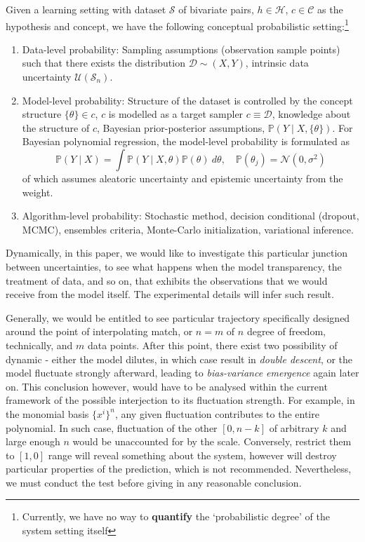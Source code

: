 \documentclass[
  journal=largetwo,
  year=2025,
  volume=37,
]{cup-journal}
\begin{document}
\begin{definition}
    Given a learning setting with dataset $\mathcal{S}$ of bivariate pairs, $h\in \mathcal{H}$, $c\in \mathcal{C}$ as the hypothesis and concept, we have the following conceptual probabilistic setting:\footnote{Currently, we have no way to \textbf{quantify} the `probabilistic degree' of the system setting itself}
    \begin{enumerate}
        \item Data-level probability: Sampling assumptions (observation sample points) such that there exists the distribution $\mathcal{D}\sim (X,Y)$, intrinsic data uncertainty $\mathcal{U}(\mathcal{S}_{n})$. 
        \item Model-level probability: Structure of the dataset is controlled by the concept structure $\{\theta\}\in c$, $c$ is modelled as a target sampler $c\equiv \mathcal{D}$, knowledge about the structure of $c$, Bayesian prior-posterior assumptions, $\mathbb{P}(Y\mid X, \{\theta\})$. For Bayesian polynomial regression, the model-level probability is formulated as \begin{equation}
            \mathbb{P}(Y\mid X) = \int \mathbb{P}(Y\mid X,\theta)\mathbb{P}(\theta)\: d\theta, \quad \mathbb{P}(\theta_{j}) = \mathcal{N}(0,\sigma^{2})
        \end{equation}
        of which assumes aleatoric uncertainty and epistemic uncertainty from the weight. 
        \item Algorithm-level probability: Stochastic method, decision conditional (dropout, MCMC), ensembles criteria, Monte-Carlo initialization, variational inference. 
    \end{enumerate}
\end{definition}

Dynamically, in this paper, we would like to investigate this particular junction between uncertainties, to see what happens when the model transparency, the treatment of data, and so on, that exhibits the observations that we would receive from the model itself. The experimental details will infer such result. 

Generally, we would be entitled to see particular trajectory specifically designed around the point of interpolating match, or $n=m$ of $n$ degree of freedom, technically, and $m$ data points. After this point, there exist two possibility of dynamic - either the model dilutes, in which case result in \textit{double descent}, or the model fluctuate strongly afterward, leading to \textit{bias-variance emergence} again later on. This conclusion however, would have to be analysed within the current framework of the possible interjection to its fluctuation strength. For example, in the monomial basis $\{x^{i}\}^{n}$, any given fluctuation contributes to the entire polynomial. In such case, fluctuation of the other $[0,n-k]$ of arbitrary $k$ and large enough $n$ would be unaccounted for by the scale. Conversely, restrict them to $[1,0]$ range will reveal something about the system, however will destroy particular properties of the prediction, which is not recommended. Nevertheless, we must conduct the test before giving in any reasonable conclusion.
\end{document}
